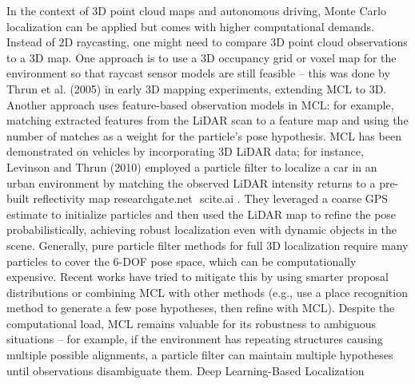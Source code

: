 In the context of 3D point cloud maps and autonomous driving, Monte Carlo localization can be applied but comes with higher computational demands. Instead of 2D raycasting, one might need to compare 3D point cloud observations to a 3D map. One approach is to use a 3D occupancy grid or voxel map for the environment so that raycast sensor models are still feasible – this was done by Thrun et al. (2005) in early 3D mapping experiments, extending MCL to 3D. Another approach uses feature-based observation models in MCL: for example, matching extracted features from the LiDAR scan to a feature map and using the number of matches as a weight for the particle’s pose hypothesis. MCL has been demonstrated on vehicles by incorporating 3D LiDAR data; for instance, Levinson and Thrun (2010) employed a particle filter to localize a car in an urban environment by matching the observed LiDAR intensity returns to a pre-built reflectivity map​
researchgate.net
​
scite.ai
. They leveraged a coarse GPS estimate to initialize particles and then used the LiDAR map to refine the pose probabilistically, achieving robust localization even with dynamic objects in the scene. Generally, pure particle filter methods for full 3D localization require many particles to cover the 6-DOF pose space, which can be computationally expensive. Recent works have tried to mitigate this by using smarter proposal distributions or combining MCL with other methods (e.g., use a place recognition method to generate a few pose hypotheses, then refine with MCL). Despite the computational load, MCL remains valuable for its robustness to ambiguous situations – for example, if the environment has repeating structures causing multiple possible alignments, a particle filter can maintain multiple hypotheses until observations disambiguate them.
Deep Learning-Based Localization

